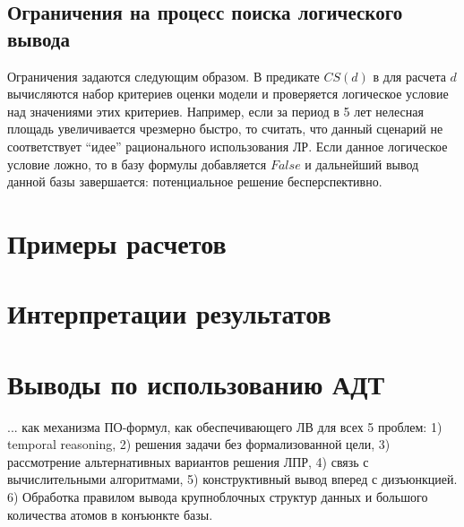 \subsection{Ограничения на процесс поиска логического вывода}

Ограничения задаются следующим образом. В предикате $CS(d)$ в для расчета $d$ вычисляются набор критериев оценки модели и проверяется логическое условие над значениями этих критериев. Например, если за период в 5 лет нелесная площадь увеличивается чрезмерно быстро, то считать, что данный сценарий не соответствует ``идее'' рационального использования ЛР. Если данное логическое условие ложно, то в базу формулы добавляется $False$ и дальнейший вывод данной базы завершается: потенциальное решение бесперспективно.


\section{Примеры расчетов}


\section{Интерпретации результатов}

\section{Выводы по использованию АДТ}

... как механизма ПО-формул, как обеспечивающего ЛВ для всех 5 проблем: 1) temporal reasoning, 2) решения задачи без формализованной цели, 3) рассмотрение альтернативных вариантов решения ЛПР, 4) связь с вычислительными алгоритмами, 5) конструктивный вывод вперед с дизъюнкцией. 6) Обработка правилом вывода крупноблочных структур данных и большого количества атомов в конъюнкте базы.
